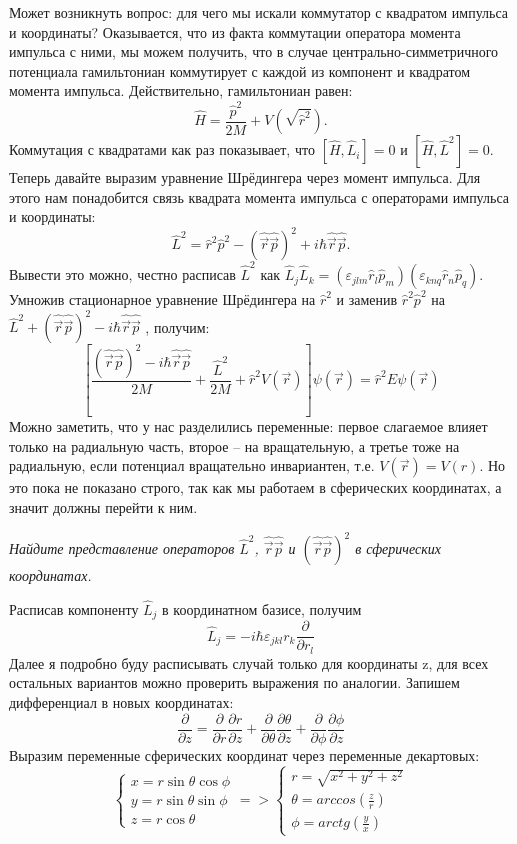 Может возникнуть вопрос: для чего мы искали коммутатор с квадратом импульса и координаты? Оказывается, что из факта коммутации оператора момента импульса с ними, мы можем получить, что в случае центрально-симметричного потенциала гамильтониан коммутирует с каждой из компонент и квадратом момента импульса. Действительно, гамильтониан равен: 
\[
\hat{H} = \frac{\hat{p}^2}{2M} + V(\sqrt{\hat{r}^2}).
\]
Коммутация с квадратами как раз показывает, что $[\hat{H}, \hat{L}_i] = 0$ и $[\hat{H}, \hat{L}^2] = 0$. Теперь давайте выразим уравнение Шрёдингера через момент импульса. Для этого нам понадобится связь квадрата момента импульса с операторами импульса и координаты:
\[
\hat{L}^2 = \hat{r}^2\hat{p}^2 - (\hat{\Vec{r}}\hat{\Vec{p}})^2 + i\hbar\hat{\Vec{r}}\hat{\Vec{p}}.
\]
Вывести это можно, честно расписав $\hat{L}^2$ как $\hat{L}_j\hat{L}_k = (\varepsilon_{jlm}\hat{r}_l\hat{p}_m)(\varepsilon_{knq}\hat{r}_n\hat{p}_q)$. Умножив стационарное уравнение Шрёдингера на $\hat{r}^2$ и заменив $\hat{r}^2\hat{p}^2$ на $\hat{L}^2 + (\hat{\Vec{r}}\hat{\Vec{p}})^2 - i\hbar\hat{\Vec{r}}\hat{\Vec{p}}$ , получим:
\[
\left[\frac{(\hat{\Vec{r}}\hat{\Vec{p}})^2 - i\hbar\hat{\Vec{r}}\hat{\Vec{p}}}{2M} + \frac{\hat{L}^2}{2M} + \hat{r}^2 V(\Vec{r})\right]\psi(\Vec{r}) = \hat{r}^2 E\psi(\Vec{r})
\]
Можно заметить, что у нас разделились переменные: первое слагаемое влияет только на радиальную часть, второе -- на вращательную, а третье тоже на радиальную, если потенциал вращательно инвариантен, т.е. $V(\Vec{r}) = V(r)$. Но это пока не показано строго, так как мы работаем в сферических координатах, а значит должны перейти к ним.
\begin{center}
    \textit{Найдите представление операторов $\hat{L}^2$, $\hat{\Vec{r}}\hat{\Vec{p}}$ и $(\hat{\Vec{r}}\hat{\Vec{p}})^2$ в сферических координатах.}
\end{center}
Расписав компоненту $\hat{L}_j$ в координатном базисе, получим 
\[
\hat{L}_j = -i\hbar\varepsilon_{jkl}r_k\frac{\partial}{\partial r_l}
\]
Далее я подробно буду расписывать случай только для координаты z, для всех остальных вариантов можно проверить выражения по аналогии. Запишем дифференциал в новых координатах:
\[
\frac{\partial }{\partial z} = \frac{\partial}{\partial r}\frac{\partial r}{\partial z} + \frac{\partial}{\partial \theta}\frac{\partial \theta}{\partial z} + \frac{\partial}{\partial \phi}\frac{\partial \phi}{\partial z}
\]
Выразим переменные сферических координат через переменные декартовых:
\begin{equation*}
    \begin{cases}
        x = r\sin\theta\cos\phi\\
        y = r\sin\theta\sin\phi\\
        z = r\cos\theta
    \end{cases}
    =>
    \begin{cases}
        r = \sqrt{x^2 + y^2 + z^2}\\
        \theta = arccos(\frac{z}{r})\\
        \phi = arctg(\frac{y}{x})
    \end{cases}
\end{equation*}
